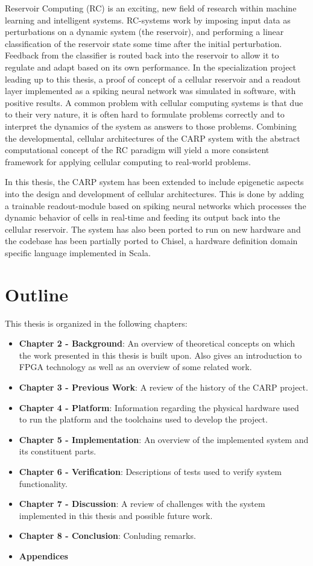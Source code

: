 Reservoir Computing (RC) is an exciting, new field of research within machine
learning and intelligent systems. RC-systems work by imposing input data as
perturbations on a dynamic system (the reservoir), and performing a linear
classification of the reservoir state some time after the initial perturbation.
Feedback from the classifier is routed back into the reservoir to allow it to
regulate and adapt based on its own performance. In the specialization project
leading up to this thesis, a proof of concept of a cellular reservoir and a
readout layer implemented as a spiking neural network was simulated in software,
with positive results. A common problem with cellular computing systems is that
due to their very nature, it is often hard to formulate problems correctly and
to interpret the dynamics of the system as answers to those problems. Combining
the developmental, cellular architectures of the CARP system with the abstract
computational concept of the RC paradigm will yield a more consistent framework
for applying cellular computing to real-world problems.

In this thesis, the CARP system has been extended to include epigenetic aspects
into the design and development of cellular architectures. This is done by
adding a trainable readout-module based on spiking neural networks which
processes the dynamic behavior of cells in real-time and feeding its output back
into the cellular reservoir. The system has also been ported to run on new hardware and
the codebase has been partially ported to Chisel, a hardware definition domain
specific language implemented in Scala.

\section{Outline}

This thesis is organized in the following chapters:

\begin{itemize}
\item \textbf{Chapter 2 - Background}: An overview of theoretical concepts on which the
  work presented in this thesis is built upon. Also gives an introduction to
  FPGA technology as well as an overview of some related work.
\item \textbf{Chapter 3 - Previous Work}: A review of the history of the CARP project.
\item \textbf{Chapter 4 - Platform}: Information regarding the physical hardware used to
  run the platform and the toolchains used to develop the project.
\item \textbf{Chapter 5 - Implementation}: An overview of the implemented system and its
  constituent parts.
\item \textbf{Chapter 6 - Verification}: Descriptions of tests used to verify system functionality.
\item \textbf{Chapter 7 - Discussion}: A review of challenges with the system implemented
  in this thesis and possible future work.
\item \textbf{Chapter 8 - Conclusion}: Conluding remarks.
\item \textbf{Appendices}
\end{itemize}

\cleardoublepage
